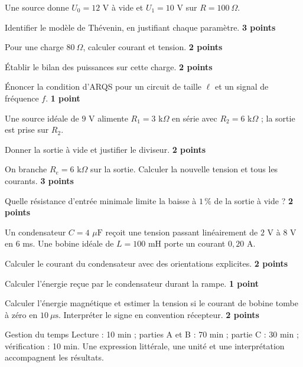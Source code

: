 Une source donne $U_0=12$ V à vide et $U_1=10$ V sur $R=100\ \Omega$.
\begin{questions}
\item Identifier le modèle de Thévenin, en justifiant chaque paramètre. \textbf{3 points}
\item Pour une charge $80\ \Omega$, calculer courant et tension. \textbf{2 points}
\item Établir le bilan des puissances sur cette charge. \textbf{2 points}
\item Énoncer la condition d’ARQS pour un circuit de taille $\ell$ et un signal de fréquence $f$. \textbf{1 point}
\end{questions}
Une source idéale de $9$ V alimente $R_1=3$ k$\Omega$ en série avec $R_2=6$ k$\Omega$ ; la sortie est prise sur $R_2$.
\begin{questions}
\item Donner la sortie à vide et justifier le diviseur. \textbf{2 points}
\item On branche $R_e=6$ k$\Omega$ sur la sortie. Calculer la nouvelle tension et tous les courants. \textbf{3 points}
\item Quelle résistance d’entrée minimale limite la baisse à $1\,\%$ de la sortie à vide ? \textbf{2 points}
\end{questions}


Un condensateur $C=4$ $\mu\mathrm{ F}$ reçoit une tension passant linéairement de $2$ V à $8$ V en $6$ ms. Une bobine idéale de $L=100$ mH porte un courant $0{,}20$ A.
\begin{questions}
\item Calculer le courant du condensateur avec des orientations explicites. \textbf{2 points}
\item Calculer l’énergie reçue par le condensateur durant la rampe. \textbf{1 point}
\item Calculer l’énergie magnétique et estimer la tension si le courant de bobine tombe à zéro en $10\ \mu\mathrm{ s}$. Interpréter le signe en convention récepteur. \textbf{2 points}
\end{questions}
\begin{docu}{Gestion du temps}
Lecture : 10 min ; parties A et B : 70 min ; partie C : 30 min ; vérification : 10 min. Une expression littérale, une unité et une interprétation accompagnent les résultats.
\end{docu}


